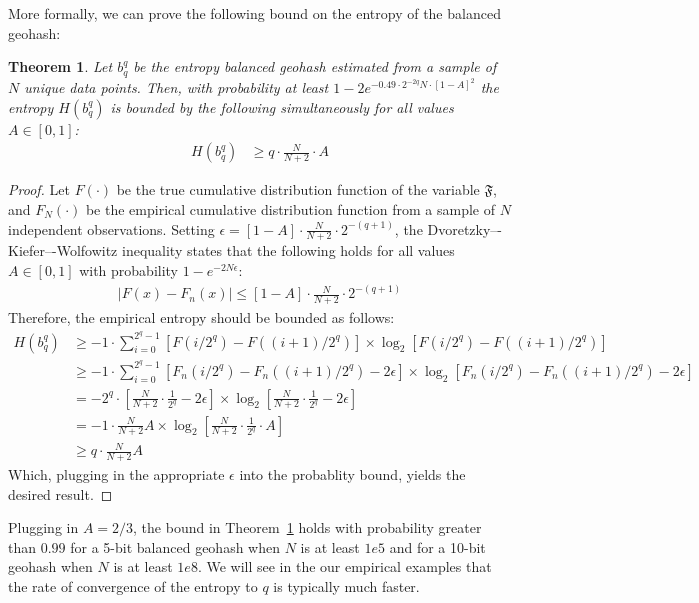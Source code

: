 \documentclass[nips13submit_09,times,art10]{article} %
\newtheorem{thm}{Theorem}
\begin{document}
More formally, we can prove the following bound on the entropy of the balanced geohash:
\begin{thm} \label{entropyThm}
Let $b_q^q$ be the entropy balanced geohash estimated from a sample of $N$ unique data points. Then,
with probability at least $1 - 2 e^{-0.49 \cdot 2^{-2q} N \cdot [1 - A]^2}$ the entropy
$H(b_q^q)$ is bounded by the following simultaneously for all values $A \in [0,1]$:
\begin{align}
H(b_q^q) &\geq q \cdot \frac{N}{N+2} \cdot A
\end{align}
\end{thm}
\begin{proof}
Let $F(\cdot)$ be the true cumulative distribution function of the variable $\mathfrak{F}$,
and $F_N(\cdot)$ be the empirical cumulative distribution function from a sample of $N$
independent observations. Setting $\epsilon = [1 - A] \cdot \frac{N}{N+2} \cdot 2^{-(q+1)}$,
the Dvoretzky–-Kiefer–-Wolfowitz inequality states \cite{dvoretzky1956asymptotic} that
the following holds for all values
$A \in [0,1]$ with probability $1 - e^{-2N\epsilon}$:
\begin{align}
|F(x) - F_n(x)| \leq [1 - A] \cdot \frac{N}{N+2} \cdot 2^{-(q+1)}
\end{align}
Therefore, the empirical entropy should be bounded as follows:
\begin{align}
H(b_q^q) &\geq -1 \cdot \sum_{i=0}^{2^q-1} \left[F(i/2^q) - F((i+1)/2^q)\right] \times
  \log_2 \left[F(i/2^q) - F((i+1)/2^q)\right] \\
&\geq -1 \cdot \sum_{i=0}^{2^q-1} \left[F_n(i/2^q) - F_n((i+1)/2^q) - 2\epsilon \right] \times
  \log_2 \left[F_n(i/2^q) - F_n((i+1)/2^q) - 2\epsilon \right] \\
&= -2^{q} \cdot \left[\frac{N}{N+2} \cdot \frac{1}{2^q} - 2 \epsilon \right] \times
  \log_2 \left[\frac{N}{N+2} \cdot \frac{1}{2^q} - 2 \epsilon  \right] \\
&= -1 \cdot \frac{N}{N+2} A \times \log_2 \left[\frac{N}{N+2} \cdot \frac{1}{2^q} \cdot A  \right] \\
&\geq q \cdot \frac{N}{N+2} A
\end{align}
Which, plugging in the appropriate $\epsilon$ into the probablity bound, yields the desired result.
\end{proof}
Plugging in $A=2/3$, the bound in Theorem~\ref{entropyThm} holds with probability greater than $0.99$
for a 5-bit balanced geohash when $N$ is at least $1e5$ and for a 10-bit geohash when $N$ is at
least $1e8$. We will see in the our empirical examples that the rate of convergence of the entropy
to $q$ is typically much faster.
\end{document}
